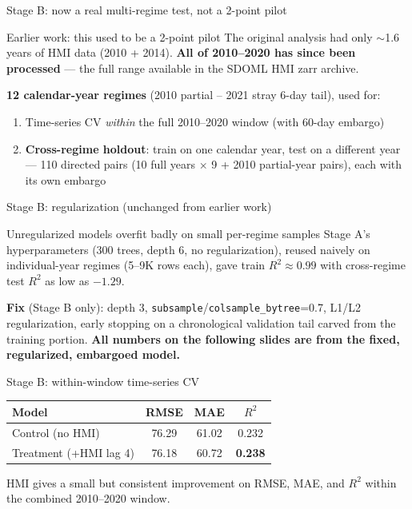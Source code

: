 \documentclass[11pt]{beamer}
\begin{document}
\begin{frame}{Stage B: now a real multi-regime test, not a 2-point pilot}
\begin{alertblock}{Earlier work: this used to be a 2-point pilot}
The original analysis had only $\sim$1.6 years of HMI data (2010 + 2014). \textbf{All of 2010--2020 has since been processed} --- the full range available in the SDOML HMI zarr archive.
\end{alertblock}
\vspace{0.3cm}
\textbf{12 calendar-year regimes} (2010 partial -- 2021 stray 6-day tail), used for:
\begin{enumerate}
  \item Time-series CV \emph{within} the full 2010--2020 window (with 60-day embargo)
  \item \textbf{Cross-regime holdout}: train on one calendar year, test on a different year --- 110 directed pairs (10 full years $\times$ 9 + 2010 partial-year pairs), each with its own embargo
\end{enumerate}
\end{frame}

\begin{frame}{Stage B: regularization (unchanged from earlier work)}
\begin{alertblock}{Unregularized models overfit badly on small per-regime samples}
Stage A's hyperparameters (300 trees, depth 6, no regularization), reused naively on individual-year regimes (5--9K rows each), gave train $R^2 \approx 0.99$ with cross-regime test $R^2$ as low as $-1.29$.
\end{alertblock}
\vspace{0.3cm}
\textbf{Fix} (Stage B only): depth 3, \texttt{subsample}/\texttt{colsample\_bytree}=0.7, L1/L2 regularization, early stopping on a chronological validation tail carved from the training portion.
\vspace{0.2cm}
\textbf{All numbers on the following slides are from the fixed, regularized, embargoed model.}
\end{frame}

\begin{frame}{Stage B: within-window time-series CV}
\begin{table}
\centering
\begin{tabular}{lccc}
\toprule
Model & RMSE & MAE & $R^2$ \\
\midrule
Control (no HMI) & 76.29 & 61.02 & 0.232 \\
Treatment (+HMI lag 4) & 76.18 & 60.72 & \textbf{0.238} \\
\bottomrule
\end{tabular}
\end{table}
HMI gives a small but consistent improvement on RMSE, MAE, and $R^2$ within the combined 2010--2020 window.
\end{frame}
\end{document}
